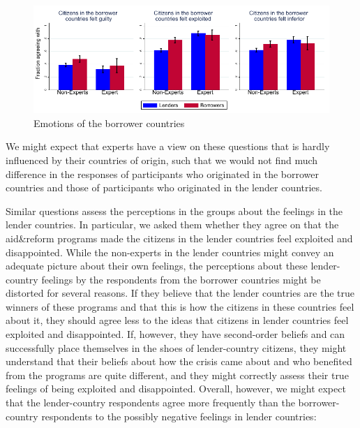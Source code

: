 
\begin{figure}
    \centering
    \caption{Emotions of the borrower countries}
    \includegraphics[scale=1.2]{graph5_1.pdf}
    
    \label{fig:my_label}
\end{figure}

We might expect that experts have a view on these questions that is hardly influenced by their countries of origin, such that we would not find much
difference in the responses of participants who originated in the borrower
countries and those of participants who originated in the lender countries.


Similar questions assess the perceptions in the groups about the
feelings in the lender countries. In particular, we asked them whether they
agree on that the aid\&reform programs made the citizens in the
lender countries feel exploited and disappointed. While the non-experts in the lender
countries might convey an adequate picture about their own feelings, the
perceptions about these lender-country feelings by the respondents from the
borrower countries might be distorted for several reasons. If they believe
that the lender countries are the true winners of these programs and that
this is how the citizens in these countries feel about it, they should agree
less to the ideas that citizens in lender countries feel exploited and
disappointed. If, however, they have second-order beliefs and can
successfully place themselves in the shoes of lender-country citizens, they
might understand that their beliefs about how the crisis came about and who
benefited from the programs are quite different, and they might correctly
assess their true feelings of being exploited and disappointed. Overall,
however, we might expect that the lender-country respondents agree more
frequently than the borrower-country respondents to the possibly negative
feelings in lender countries:

